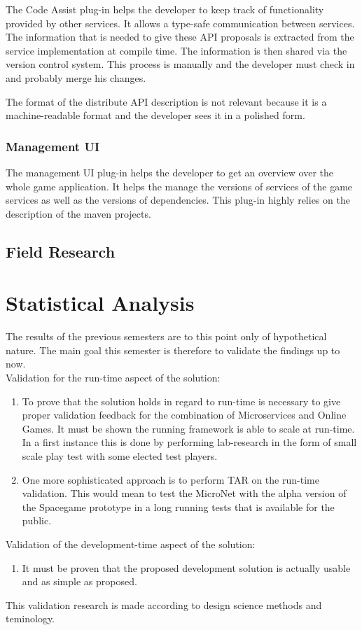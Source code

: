 The Code Assist plug-in helps the developer to keep track of functionality
provided by other services. It allows a type-safe communication between
services. The information that is needed to give these API proposals is
extracted from the service implementation at compile time. The information is
then shared via the version control system. This process is manually and the
developer must check in and probably merge his changes. 

The format of the distribute API description is not relevant because it is a
machine-readable format and the developer sees it in a polished form.

\subsubsection{Management UI}

The management UI plug-in helps the developer to get an overview over the whole
game application. It helps the manage the versions of services of the game
services as well as the versions of dependencies. This plug-in highly relies on
the description of the maven projects.

\subsection{Field Research}

\section{Statistical Analysis}

The results of the previous semesters are to this point only of hypothetical
nature. The main goal this semester is therefore to validate the findings up to
now.\\

Validation for the run-time aspect of the solution:

\begin{enumerate}
  \item To prove that the solution holds in regard to run-time is necessary to
  give proper validation feedback for the combination of Microservices and
  Online Games. It must be shown the running framework is able to scale at
  run-time. In a first instance this is done by performing lab-research in the
  form of small scale play test with some elected test players.
  \item One more sophisticated approach is to perform TAR on the run-time
  validation. This would mean to test the MicroNet with the alpha version of the
  Spacegame prototype in a long running tests that is available for the public. 
\end{enumerate}

Validation of the development-time aspect of the solution:

\begin{enumerate}
  \item It must be proven that the proposed development solution is actually
  usable and as simple as proposed.
\end{enumerate}

This validation research is made according to design science methods and
teminology.